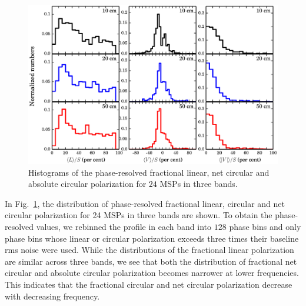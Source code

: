 \documentclass[useAMS,usenatbib]{mn2e}
\begin{document}
\begin{figure}
\begin{center}
\includegraphics[width=5.5 in]{polHist.ps}
\caption{Histograms of the phase-resolved fractional linear, net circular and absolute circular 
polarization for $24$ MSPs in three bands.}
\label{polHist}
\end{center}
\end{figure}

In Fig.~\ref{polHist}, the distribution of phase-resolved fractional linear, 
circular and net circular polarization for 24 MSPs in three bands are shown.
%
To obtain the phase-resolved values, we rebinned the profile in each band into 
$128$ phase bins and only phase bins whose linear or circular polarization 
exceeds three times their baseline rms noise were used. 
%
While the distributions of the fractional linear polarization are similar 
across three bands, we see that both the distribution of fractional net circular 
and absolute circular polarization becomes narrower at lower 
frequencies. 
%
This indicates that the fractional circular and net circular polarization 
decrease with decreasing frequency.
\end{document}
